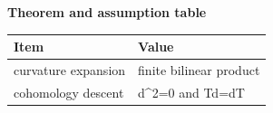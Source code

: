 \begin{center}
\textbf{Theorem and assumption table}\par\smallskip
\begin{tabular}{ll}
\toprule
Item & Value \\
\midrule
curvature expansion & finite bilinear product \\
cohomology descent & d\^{}2=0 and Td=dT \\
\bottomrule
\end{tabular}
\end{center}
